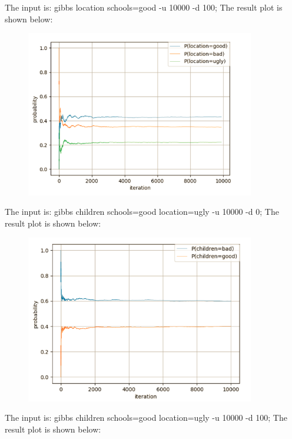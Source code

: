 \documentclass[11pt, a4paper]{article}
\begin{document}
The input is: gibbs location schools=good -u 10000 -d 100; The result plot is shown below: 

\newpage

\begin{figure}[htbp]
	
	\centering 
	\includegraphics[width=10cm]{gs_15}
	
	\label{fig:gb15}
	
\end{figure}

The input is: gibbs children schools=good location=ugly -u 10000 -d 0; The result plot is shown below: 

\begin{figure}[htbp]
	
	\centering 
	\includegraphics[width=10cm]{gs_16}
	
	\label{fig:gb16}
	
\end{figure}

The input is: gibbs children schools=good location=ugly -u 10000 -d 100; The result plot is shown below:
\end{document}
